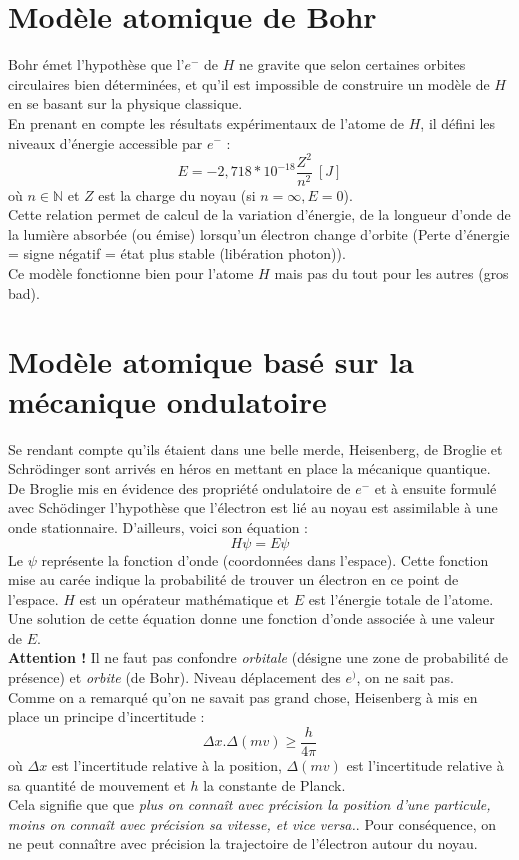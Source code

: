 \documentclass[british,french,11pt, a4paper, openany]{book}
\begin{document}
\section{Modèle atomique de Bohr}
Bohr émet l'hypothèse que l'$e^-$ de $H$ ne gravite que selon certaines orbites circulaires bien déterminées, et qu'il est impossible de construire un modèle de $H$ en se basant sur la physique classique.\\
En prenant en compte les résultats expérimentaux de l'atome de $H$, il défini les niveaux d'énergie accessible par $e^-$ :
$$E = -2,718*10^{-18} \frac{Z^2}{n^2}\ [J]$$
où $n \in \mathbb{N}$ et $Z$ est la charge du noyau (si $n = \infty, E = 0$).\\
Cette relation permet de calcul de la variation d'énergie, de la longueur d'onde de la lumière absorbée (ou émise) lorsqu'un électron change d'orbite (Perte d'énergie = signe négatif = état plus stable (libération photon)).\\

Ce modèle fonctionne bien pour l'atome $H$ mais pas du tout pour les autres (gros bad).

\section{Modèle atomique basé sur la mécanique ondulatoire}
Se rendant compte qu'ils étaient dans une belle merde, Heisenberg, de Broglie et Schrödinger sont arrivés en héros en mettant en place la mécanique quantique.\\

De Broglie mis en évidence des propriété ondulatoire de $e^-$ et à ensuite formulé avec Schödinger l'hypothèse que l'électron est lié au noyau est assimilable à une onde stationnaire. D'ailleurs, voici son équation  :
$$H\psi = E\psi$$
Le $\psi$ représente la fonction d'onde (coordonnées dans l'espace). Cette fonction mise au carée indique la probabilité de trouver un électron en ce point de l'espace. $H$ est un opérateur mathématique et $E$ est l'énergie totale de l'atome.\\
Une solution de cette équation donne une fonction d'onde associée à une valeur de $E$.\\

\textbf{Attention ! } Il ne faut pas confondre \textit{orbitale} (désigne une zone de probabilité de présence) et \textit{orbite} (de Bohr). Niveau déplacement des $e^)$, on ne sait pas.\\

Comme on a remarqué qu'on ne savait pas grand chose, Heisenberg à mis en place un principe d'incertitude :
$$\Delta x . \Delta (mv) \geq \frac{h}{4\pi}$$
où $\Delta x$ est l'incertitude relative à la position, $\Delta (mv)$ est l'incertitude relative à sa quantité de mouvement et $h$ la constante de Planck.\\
Cela signifie que que \textit{plus on connaît avec précision la position d'une particule, moins on connaît avec précision sa vitesse, et vice versa.}. Pour conséquence, on ne peut connaître avec précision la trajectoire de l'électron autour du noyau.\\
\end{document}
